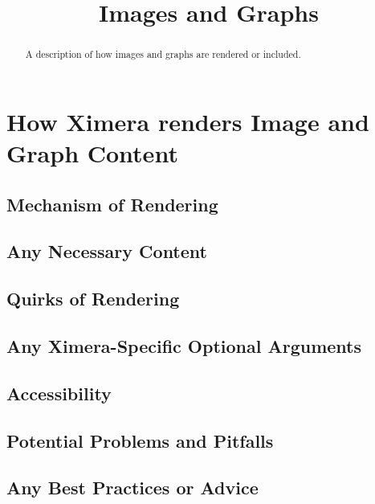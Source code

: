 \documentclass{ximera}
\title{Images and Graphs}
\begin{document}
\begin{abstract}
    A description of how images and graphs are rendered or included.
\end{abstract}
\maketitle
   
\section*{How Ximera renders Image and Graph Content}
    \subsection*{Mechanism of Rendering}
    
    
    
    \subsection*{Any Necessary Content}
    
    
    
    \subsection*{Quirks of Rendering}
    
    
    
    \subsection*{Any Ximera-Specific Optional Arguments}
    
    
    
    \subsection*{Accessibility}
    
    
    
    \subsection*{Potential Problems and Pitfalls}
    
    
    
    \subsection*{Any Best Practices or Advice}
    
    

    
\end{document}
